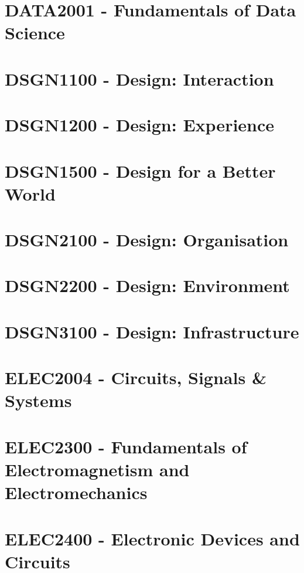 \documentclass[a4paper,12pt]{report}
\begin{document}
\hypertarget{DATA2001}{\section{DATA2001 - Fundamentals of Data Science}}

\hypertarget{DSGN1100}{\section{DSGN1100 - Design: Interaction}}

\hypertarget{DSGN1200}{\section{DSGN1200 - Design: Experience}}

\hypertarget{DSGN1500}{\section{DSGN1500 - Design for a Better World}}

\hypertarget{DSGN2100}{\section{DSGN2100 - Design: Organisation}}

\hypertarget{DSGN2200}{\section{DSGN2200 - Design: Environment}}

\hypertarget{DSGN3100}{\section{DSGN3100 - Design: Infrastructure}}

\hypertarget{ELEC2004}{\section{ELEC2004 - Circuits, Signals \& Systems}}

\hypertarget{ELEC2300}{\section{ELEC2300 - Fundamentals of Electromagnetism and Electromechanics}}

\hypertarget{ELEC2400}{\section{ELEC2400 - Electronic Devices and Circuits}}
\end{document}
